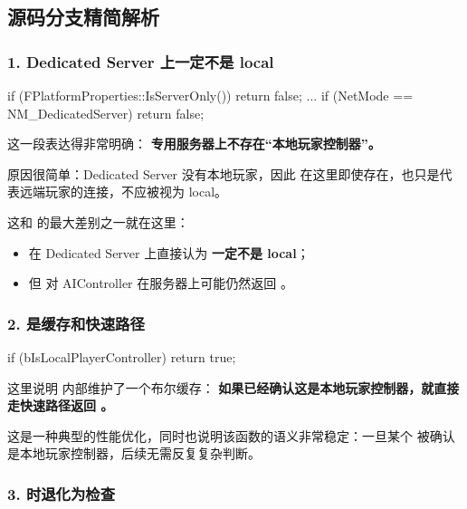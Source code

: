 \subsection{源码分支精简解析}

\subsubsection*{1. Dedicated Server 上一定不是 local}

\begin{code}
	if (FPlatformProperties::IsServerOnly())
	{
		return false;
	}
	...
	if (NetMode == NM_DedicatedServer)
	{
		return false;
	}
\end{code}

这一段表达得非常明确：
\textbf{专用服务器上不存在“本地玩家控制器”。}

原因很简单：Dedicated Server 没有本地玩家，因此  在这里即使存在，也只是代表远端玩家的连接，不应被视为 local。

这和  的最大差别之一就在这里：

\begin{itemize}
	\item {} 在 Dedicated Server 上直接认为 \textbf{一定不是 local}；
	\item 但  对 AIController 在服务器上可能仍然返回 。
\end{itemize}

\subsubsection*{2.  是缓存和快速路径}

\begin{code}
	if (bIsLocalPlayerController)
	{
		return true;
	}
\end{code}

这里说明  内部维护了一个布尔缓存：	\textbf{如果已经确认这是本地玩家控制器，就直接走快速路径返回 。}

这是一种典型的性能优化，同时也说明该函数的语义非常稳定：一旦某个  被确认是本地玩家控制器，后续无需反复复杂判断。

\subsubsection*{3.  时退化为检查 }

